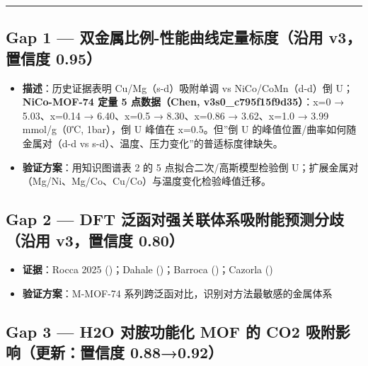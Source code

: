 \documentclass[12pt,a4paper]{ctexart}
\providecommand{\tightlist}{%
  \setlength{\itemsep}{0pt}\setlength{\parskip}{0pt}}
\begin{document}
\begin{center}\rule{0.5\linewidth}{0.5pt}\end{center}

\subsection{Gap 1 --- 双金属比例-性能曲线定量标度（沿用 v3，置信度 0.95）}\label{gap:gap-1-ux53ccux91d1ux5c5eux6bd4ux4f8b-ux6027ux80fdux66f2ux7ebfux5b9aux91cfux6807ux5ea6ux6cbfux7528-v3ux7f6eux4fe1ux5ea6-0.95}

\begin{itemize}
\tightlist
\item
  \textbf{描述}：历史证据表明 Cu/Mg（s-d）吸附单调 vs NiCo/CoMn（d-d）倒 U；\textbf{NiCo-MOF-74 定量 5 点数据（Chen, v3s0\_c795f15f9d35）}：x=0 → 5.03、x=0.14 → 6.40、x=0.5 → 8.30、x=0.86 → 3.62、x=1.0 → 3.99 mmol/g（0℃, 1bar），倒 U 峰值在 x=0.5。但''倒 U 的峰值位置/曲率如何随金属对（d-d vs s-d）、温度、压力变化''的普适标度律缺失。
\item
  \textbf{验证方案}：用知识图谱表 2 的 5 点拟合二次/高斯模型检验倒 U；扩展金属对（Mg/Ni、Mg/Co、Cu/Co）与温度变化检验峰值迁移。
\end{itemize}

\subsection{Gap 2 --- DFT 泛函对强关联体系吸附能预测分歧（沿用 v3，置信度 0.80）}\label{gap:gap-2-dft-ux6cdbux51fdux5bf9ux5f3aux5173ux8054ux4f53ux7cfbux5438ux9644ux80fdux9884ux6d4bux5206ux6b67ux6cbfux7528-v3ux7f6eux4fe1ux5ea6-0.80}

\begin{itemize}
\tightlist
\item
  \textbf{证据}：Rocca 2025 (\cite{p30})；Dahale (\cite{p2})；Barroca (\cite{p10})；Cazorla (\cite{p36})
\item
  \textbf{验证方案}：M-MOF-74 系列跨泛函对比，识别对方法最敏感的金属体系
\end{itemize}

\subsection{Gap 3 --- H2O 对胺功能化 MOF 的 CO2 吸附影响（更新：置信度 0.88→0.92）}\label{gap:gap-3-h2o-ux5bf9ux80faux529fux80fdux5316-mof-ux7684-co2-ux5438ux9644ux5f71ux54cdux66f4ux65b0ux7f6eux4fe1ux5ea6-0.880.92}
\end{document}
